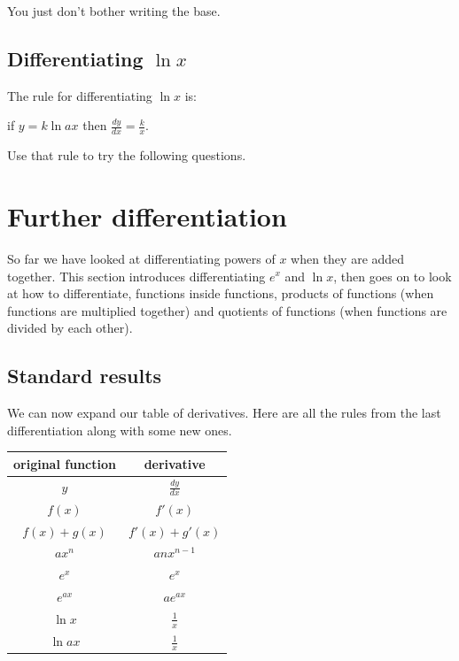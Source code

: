 \documentclass[
  a4paper,
]{scrbook}
\newcounter{none} %
\begin{document}
You just don't bother writing the base.

\section{\texorpdfstring{Differentiating
\(\ln{x}\)}{Differentiating \textbackslash ln\{x\}}}\label{differentiating-lnx}

The rule for differentiating \(\ln{x}\) is:

\begin{tcolorbox}[enhanced jigsaw, arc=.35mm, bottomrule=.15mm, bottomtitle=1mm, breakable, colback=white, colbacktitle=quarto-callout-note-color!10!white, colframe=quarto-callout-note-color-frame, coltitle=black, left=2mm, leftrule=.75mm, opacityback=0, opacitybacktitle=0.6, rightrule=.15mm, title=\textcolor{quarto-callout-note-color}{\faInfo}\hspace{0.5em}{Key point:}, titlerule=0mm, toprule=.15mm, toptitle=1mm]

if \(y = k\ln{ax}\) then \(\frac{dy}{dx}= \frac{k}{x}\).

\end{tcolorbox}

Use that rule to try the following questions.


\chapter{Further differentiation}\label{further-differentiation}

So far we have looked at differentiating powers of \(x\) when they are
added together. This section introduces differentiating \(e^x\) and
\(\ln{x}\), then goes on to look at how to differentiate, functions
inside functions, products of functions (when functions are multiplied
together) and quotients of functions (when functions are divided by each
other).

\section{Standard results}\label{standard-results}

We can now expand our table of derivatives. Here are all the rules from
the last differentiation along with some new ones.

{\def\LTcaptype{none} %
\begin{longtable}[]{@{}cc@{}}
\toprule\noalign{}
original function & derivative \\
\midrule\noalign{}
\endhead
\bottomrule\noalign{}
\endlastfoot
\(y\) & \(\frac{dy}{dx}\) \\
\(f(x)\) & \(f'(x)\) \\
\(f(x) + g(x)\) & \(f'(x) + g'(x)\) \\
\(ax^n\) & \(anx^{n-1}\) \\
\(e^x\) & \(e^x\) \\
\(e^{ax}\) & \(ae^{ax}\) \\
\(\ln{x}\) & \(\frac{1}{x}\) \\
\(\ln{ax}\) & \(\frac{1}{x}\) \\
\end{longtable}
}
\end{document}
